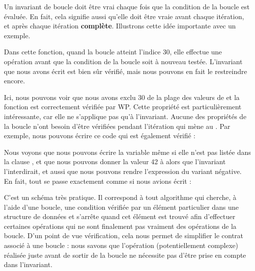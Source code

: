 

Un invariant de boucle doit être vrai chaque fois que la condition de la boucle est
évaluée. En fait, cela signifie aussi qu'elle doit être vraie avant chaque itération,
et après chaque itération \textbf{complète}. Illustrons cette idée importante avec un
exemple.




Dans cette fonction, quand la boucle atteint l'indice 30, elle effectue une opération
 avant que la condition de la boucle soit à nouveau testée.
L'invariant que nous avons écrit est bien sûr vérifié, mais nous pouvons en fait le
restreindre encore.






Ici, nous pouvons voir que nous avons exclu 30 de la plage des valeurs de
 et la fonction est correctement vérifiée par WP. Cette propriété
est particulièrement intéressante, car elle ne s'applique pas qu'à l'invariant.
Aucune des propriétés de la boucle n'ont besoin d'être vérifiées pendant l'itération
qui mène au . Par exemple, nous pouvons écrire ce code qui est
également vérifié :





Nous voyons que nous pouvons écrire la variable  même si elle
n'est pas listée dans la clause , et que nous pouvons
donner la valeur 42 à  alors que l'invariant l'interdirait, et aussi
que nous pouvons rendre l'expression du variant négative. En fait, tout se passe
exactement comme si nous avions écrit :





C'est un schéma très pratique. Il correspond à tout algorithme qui cherche, à l'aide
d'une boucle, une condition vérifiée par un élément particulier dans une structure
de données et s'arrête quand cet élément est trouvé afin d'effectuer certaines
opérations qui ne sont finalement pas vraiment des opérations de la boucle. D'un
point de vue vérification, cela nous permet de simplifier le contrat associé à
une boucle : nous savons que l'opération (potentiellement complexe) réalisée
juste avant de sortir de la boucle ne nécessite pas d'être prise en compte dans
l'invariant.



